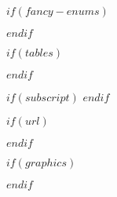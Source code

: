 

\usepackage[flushmargin]{footmisc-2011-06-06}

\setlength{\parindent}{0pt}
\setlength{\parskip}{6pt plus 2pt minus 1pt}

$if(fancy-enums)$
\makeatletter\AtBeginDocument{%
  \renewcommand{\@listi}
    {\setlength{\labelwidth}{4em}}
}\makeatother
\usepackage{enumerate}
$endif$

$if(tables)$
\usepackage{array}
\newcommand{\PreserveBackslash}[1]{\let\temp=\\#1\let\\=\temp}
\let\PBS=\PreserveBackslash
$endif$

$if(subscript)$
\newcommand{\textsubscr}[1]{\ensuremath{_{\scriptsize\textrm{#1}}}}
$endif$

\usepackage[breaklinks=true]{hyperref}
\hypersetup{colorlinks,%
citecolor=blue,%
filecolor=blue,%
linkcolor=blue,%
urlcolor=blue}

$if(url)$
\usepackage{url}
$endif$

$if(graphics)$
\usepackage{graphicx}
\makeatletter
\def\maxwidth{\ifdim\Gin@nat@width>\linewidth\linewidth
\else\Gin@nat@width\fi}
\makeatother
\let\Oldincludegraphics\includegraphics
\renewcommand{\includegraphics}[1]{\Oldincludegraphics[width=\maxwidth]{#1}}
$endif$

